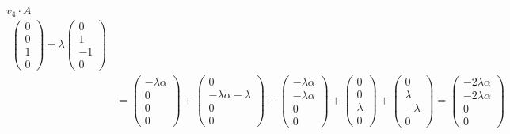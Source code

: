 \documentclass{article}
\begin{document}
\begin{enumerate}
\begin{mathcase}{\(v_4 \cdot A\)}
\[\begin{aligned}
\begin{pmatrix}
                        0 \\ 0 \\ 1 \\ 0
                    \end{pmatrix}
                    +\lambda
                    \begin{pmatrix}
                        0 \\ 1 \\ -1 \\ 0
                    \end{pmatrix} 
                    \\
                    &=
                    \begin{pmatrix}
                        -\lambda\alpha \\ 0 \\ 0 \\ 0
                    \end{pmatrix}
                    +
                    \begin{pmatrix}
                        0 \\ -\lambda\alpha - \lambda \\ 0 \\ 0
                    \end{pmatrix}
                    +
                    \begin{pmatrix}
                        -\lambda\alpha \\ -\lambda\alpha \\ 0 \\ 0
                    \end{pmatrix}
                    +
                    \begin{pmatrix}
                        0 \\ 0 \\ \lambda \\ 0
                    \end{pmatrix}
                    +
                    \begin{pmatrix}
                        0 \\ \lambda \\ -\lambda \\ 0
                    \end{pmatrix} 
                    = 
                    \begin{pmatrix}
                        -2\lambda\alpha \\ -2\lambda\alpha \\ 0 \\ 0

\end{pmatrix}
\end{aligned}\]
\end{mathcase}
\end{enumerate}
\end{document}
